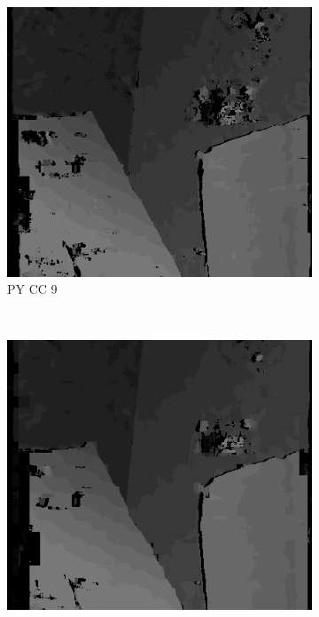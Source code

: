 \begin{figure}

  \begin{subfigure}[b]{0.23\textwidth}
    \centering
    \includegraphics[width=\textwidth]{images/stereo-pairs/venus_pyramid_crosschecked_9.png}
    \caption{PY CC 9}
  \end{subfigure}
  ~
  \begin{subfigure}[b]{0.23\textwidth}
    \centering
    \includegraphics[width=\textwidth]{images/stereo-pairs/venus_pyramid_crosschecked_13.png}

\end{subfigure}
\end{figure}
